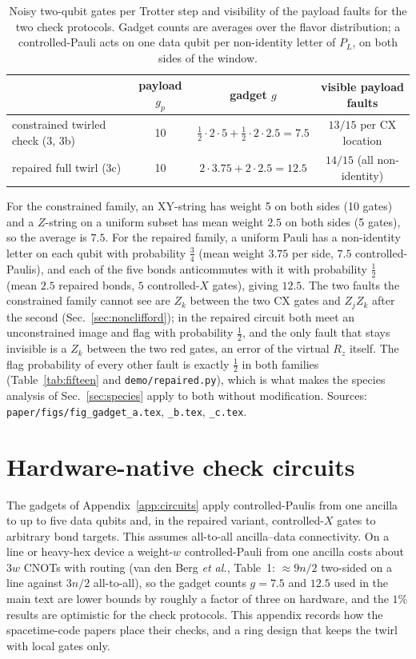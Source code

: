 \documentclass[11pt,a4paper]{article}
\theoremstyle{remark}
\begin{document}
\begin{table}[h]
\centering\small
\caption{Noisy two-qubit gates per Trotter step and visibility of the payload faults for the two check protocols. Gadget counts are averages over the flavor distribution; a controlled-Pauli acts on one data qubit per non-identity letter of $P_L$, on both sides of the window.}
\label{tab:gadget-counts}
\begin{tabular}{lccc}
\toprule
 & payload $g_p$ & gadget $g$ & visible payload faults \\
\midrule
constrained twirled check (3, 3b) & 10 & $\tfrac12\cdot2\cdot5+\tfrac12\cdot2\cdot2.5=7.5$ & $13/15$ per CX location \\
repaired full twirl (3c) & 10 & $2\cdot3.75+2\cdot2.5=12.5$ & $14/15$ (all non-identity) \\
\bottomrule
\end{tabular}
\end{table}

For the constrained family, an XY-string has weight 5 on both sides (10 gates) and a $Z$-string on a uniform subset has mean weight $2.5$ on both sides (5 gates), so the average is $7.5$. For the repaired family, a uniform Pauli has a non-identity letter on each qubit with probability $\tfrac34$ (mean weight $3.75$ per side, $7.5$ controlled-Paulis), and each of the five bonds anticommutes with it with probability $\tfrac12$ (mean $2.5$ repaired bonds, $5$ controlled-$X$ gates), giving $12.5$. The two faults the constrained family cannot see are $Z_k$ between the two CX gates and $Z_jZ_k$ after the second (Sec.~\ref{sec:nonclifford}); in the repaired circuit both meet an unconstrained image and flag with probability $\tfrac12$, and the only fault that stays invisible is a $Z_k$ between the two red gates, an error of the virtual $R_z$ itself. The flag probability of every other fault is exactly $\tfrac12$ in both families (Table~\ref{tab:fifteen} and \texttt{demo/repaired.py}), which is what makes the species analysis of Sec.~\ref{sec:species} apply to both without modification. Sources: \texttt{paper/figs/fig\_gadget\_a.tex}, \texttt{\_b.tex}, \texttt{\_c.tex}.

\section{Hardware-native check circuits}
\label{app:hardware}

The gadgets of Appendix~\ref{app:circuits} apply controlled-Paulis from one ancilla to up to five data qubits and, in the repaired variant, controlled-$X$ gates to arbitrary bond targets. This assumes all-to-all ancilla--data connectivity. On a line or heavy-hex device a weight-$w$ controlled-Pauli from one ancilla costs about $3w$ CNOTs with routing (van den Berg \emph{et al.}, Table~1: $\approx9n/2$ two-sided on a line against $3n/2$ all-to-all), so the gadget counts $g=7.5$ and $12.5$ used in the main text are lower bounds by roughly a factor of three on hardware, and the $1\%$ results are optimistic for the check protocols. This appendix records how the spacetime-code papers place their checks, and a ring design that keeps the twirl with local gates only.
\end{document}
